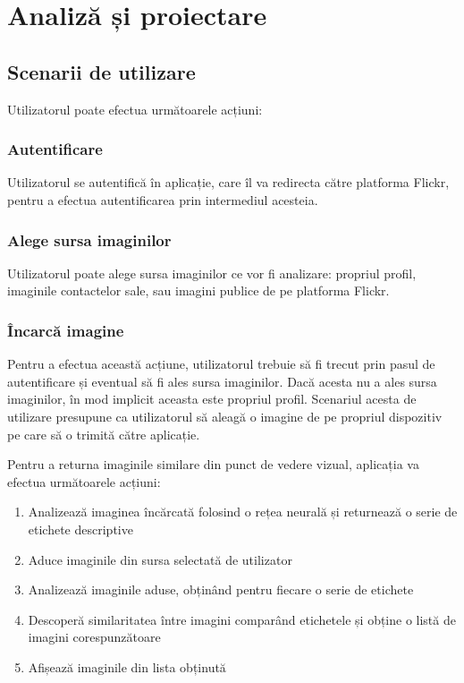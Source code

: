 \chapter{Analiză și proiectare}

\section{Scenarii de utilizare}

Utilizatorul poate efectua următoarele acțiuni:
\subsection{Autentificare}
Utilizatorul se autentifică în aplicație, care îl va redirecta către platforma Flickr, pentru a efectua autentificarea prin intermediul acesteia.

\subsection{Alege sursa imaginilor}
Utilizatorul poate alege sursa imaginilor ce vor fi analizare: propriul profil, imaginile contactelor sale, sau imagini publice de pe platforma Flickr.

\subsection{Încarcă imagine}
Pentru a efectua această acțiune, utilizatorul trebuie să fi trecut prin pasul de autentificare și eventual să fi ales sursa imaginilor. Dacă acesta nu a ales sursa imaginilor, în mod implicit aceasta este propriul profil. Scenariul acesta de utilizare presupune ca utilizatorul să aleagă o imagine de pe propriul dispozitiv pe care să o trimită către aplicație.

Pentru a returna imaginile similare din punct de vedere vizual, aplicația va efectua următoarele acțiuni:
\begin{enumerate}
    \item Analizează imaginea încărcată folosind o rețea neurală și returnează o serie de etichete descriptive
    \item Aduce imaginile  din sursa selectată de utilizator
    \item Analizează imaginile aduse, obținând pentru fiecare o serie de etichete
    \item Descoperă similaritatea între imagini comparând etichetele și obține o listă de imagini corespunzătoare
    \item Afișează imaginile din lista obținută
\end{enumerate}{}

